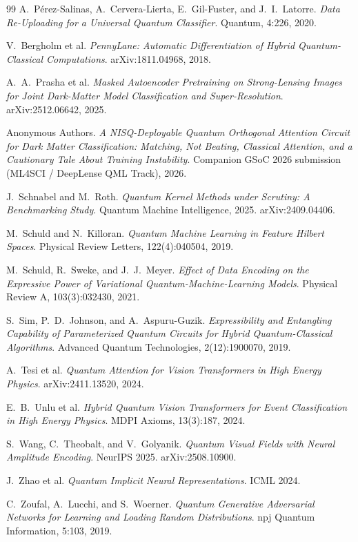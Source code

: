 \documentclass[10pt,letterpaper]{article}
\theoremstyle{plain}
\theoremstyle{definition}
\begin{document}
\begin{thebibliography}{99}
A.~P\'{e}rez-Salinas, A.~Cervera-Lierta, E.~Gil-Fuster, and J.~I.~Latorre.
\textit{Data Re-Uploading for a Universal Quantum Classifier}.
Quantum, 4:226, 2020.

V.~Bergholm et al.
\textit{PennyLane: Automatic Differentiation of Hybrid Quantum-Classical
Computations}.
arXiv:1811.04968, 2018.

A.~A.~Prasha et al.
\textit{Masked Autoencoder Pretraining on Strong-Lensing Images for Joint
Dark-Matter Model Classification and Super-Resolution}.
arXiv:2512.06642, 2025.

Anonymous Authors.
\textit{A NISQ-Deployable Quantum Orthogonal Attention Circuit for Dark Matter
Classification: Matching, Not Beating, Classical Attention, and a Cautionary Tale
About Training Instability}.
Companion GSoC 2026 submission (ML4SCI / DeepLense QML Track), 2026.

J.~Schnabel and M.~Roth.
\textit{Quantum Kernel Methods under Scrutiny: A Benchmarking Study}.
Quantum Machine Intelligence, 2025. arXiv:2409.04406.

M.~Schuld and N.~Killoran.
\textit{Quantum Machine Learning in Feature Hilbert Spaces}.
Physical Review Letters, 122(4):040504, 2019.

M.~Schuld, R.~Sweke, and J.~J.~Meyer.
\textit{Effect of Data Encoding on the Expressive Power of
Variational Quantum-Machine-Learning Models}.
Physical Review A, 103(3):032430, 2021.

S.~Sim, P.~D.~Johnson, and A.~Aspuru-Guzik.
\textit{Expressibility and Entangling Capability of Parameterized Quantum
Circuits for Hybrid Quantum-Classical Algorithms}.
Advanced Quantum Technologies, 2(12):1900070, 2019.

A.~Tesi et al.
\textit{Quantum Attention for Vision Transformers in High Energy Physics}.
arXiv:2411.13520, 2024.

E.~B.~Unlu et al.
\textit{Hybrid Quantum Vision Transformers for Event Classification in High
Energy Physics}.
MDPI Axioms, 13(3):187, 2024.

S.~Wang, C.~Theobalt, and V.~Golyanik.
\textit{Quantum Visual Fields with Neural Amplitude Encoding}.
NeurIPS 2025. arXiv:2508.10900.

J.~Zhao et al.
\textit{Quantum Implicit Neural Representations}.
ICML 2024.

C.~Zoufal, A.~Lucchi, and S.~Woerner.
\textit{Quantum Generative Adversarial Networks for Learning and Loading
Random Distributions}.
npj Quantum Information, 5:103, 2019.

\end{thebibliography}
\end{document}
